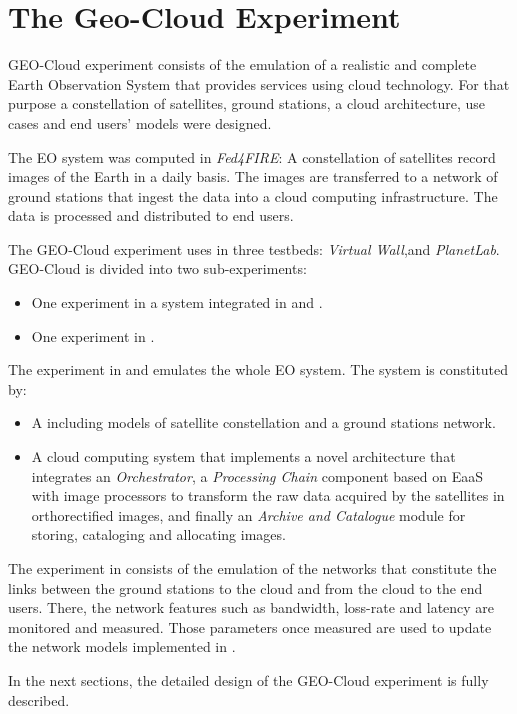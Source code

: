 
\chapter{The Geo-Cloud Experiment}
\label{chap:geocloud-experiment}
 GEO-Cloud experiment consists of the emulation of a realistic and complete Earth Observation System that provides services using cloud technology. For that purpose a constellation of satellites, ground stations, a cloud architecture, use cases and end users' models were designed.

The \ac{EO} system was computed in \emph{Fed4FIRE}: A constellation of
satellites record images of the Earth in a daily basis. The images are
transferred to a network of ground stations that ingest the data into a cloud computing infrastructure. The data is processed and distributed to end users.

The GEO-Cloud experiment uses in three testbeds: \emph{Virtual Wall},\bonfire and
\emph{PlanetLab}. GEO-Cloud is divided into two sub-experiments:
\begin{itemize}
\item One experiment in a system integrated in \vw and \bonfire.
\item One experiment in \pl.
\end{itemize}

The experiment in \vw and \bonfire emulates the whole \ac{EO} system. The system is constituted by:

\begin{itemize}
\item A \sss including models of satellite constellation and a ground stations
  network.
\item A cloud computing system that implements a novel architecture that
  integrates an \emph{Orchestrator}, a \emph{Processing Chain} component
  based on \ac{EaaS}  with image processors to transform the raw data acquired
  by the satellites in orthorectified images, and finally an \emph{Archive and Catalogue}
  module for storing, cataloging and allocating images.
\end{itemize}

The experiment in \pl consists of the emulation of the networks that constitute
the links between the ground stations to the cloud and from the cloud to the end
users. There, the network features such as bandwidth, loss-rate and latency are monitored and measured. Those parameters once measured are used to update the
network models implemented in \vw.

In the next sections, the detailed design of the GEO-Cloud experiment is fully described.
















